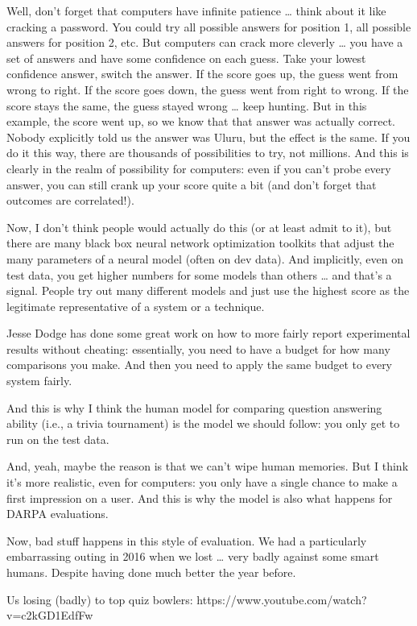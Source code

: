 Well, don’t forget that computers have infinite patience … think about it like cracking a password.  You could try all possible answers for position 1, all possible answers for position 2, etc.  But computers can crack more cleverly … you have a set of answers and have some confidence on each guess.  Take your lowest confidence answer, switch the answer.  
If the score goes up, the guess went from wrong to right.  
If the score goes down, the guess went from right to wrong.
If the score stays the same, the guess stayed wrong … keep hunting.
But in this example, the score went up, so we know that that answer was actually correct.  Nobody explicitly told us the answer was Uluru, but the effect is the same.  If you do it this way, there are thousands of possibilities to try, not millions.  And this is clearly in the realm of possibility for computers: even if you can’t probe every answer, you can still crank up your score quite a bit (and don’t forget that outcomes are correlated!).

Now, I don’t think people would actually do this (or at least admit to it), but there are many black box neural network optimization toolkits that adjust the many parameters of a neural model (often on dev data).  And implicitly, even on test data, you get higher numbers for some models than others … and that’s a signal.  People try out many different models and just use the highest score as the legitimate representative of a system or a technique.

Jesse Dodge has done some great work on how to more fairly report experimental results without cheating: essentially, you need to have a budget for how many comparisons you make.  And then you need to apply the same budget to every system fairly.

And this is why I think the human model for comparing question answering ability (i.e., a trivia tournament) is the model we should follow: you only get to run on the test data. 

And, yeah, maybe the reason is that we can’t wipe human memories.  But I think it’s more realistic, even for computers: you only have a single chance to make a first impression on a user.  And this is why the model is also what happens for DARPA evaluations.

Now, bad stuff happens in this style of evaluation.  We had a particularly embarrassing outing in 2016 when we lost … very badly against some smart humans.  Despite having done much better the year before. 

Us losing (badly) to top quiz bowlers:
https://www.youtube.com/watch?v=c2kGD1EdfFw

